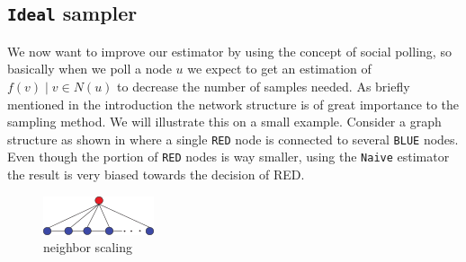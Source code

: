 \subsection{\texttt{Ideal} sampler}
We now want to improve our estimator by using the concept of social polling, so basically when we poll a node $u$ we expect to get an estimation of ${f(v)\;|\;v \in N(u)}$ to decrease the number of samples needed.
As briefly mentioned in the introduction the network structure is of great importance to the sampling method.
We will illustrate this on a small example. Consider a graph structure as shown in  where a single \texttt{RED} node is connected to several \texttt{BLUE} nodes.
Even though the portion of \texttt{RED} nodes is way smaller, using the \texttt{Naive} estimator the result is very biased towards the decision of {RED}.
\begin{figure}[!ht]
  \begin{center}
    \includegraphics{fig1a}
    \caption{neighbor scaling}
  \end{center}
\end{figure}

